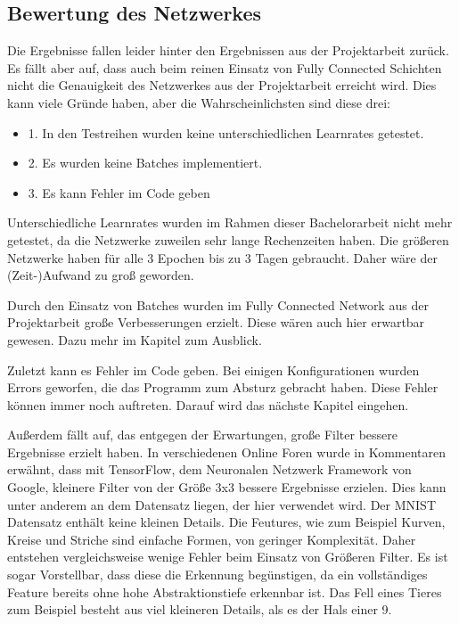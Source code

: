 \documentclass[12pt]{article}
\begin{document}
\subsection{Bewertung des Netzwerkes}
Die Ergebnisse fallen leider hinter den Ergebnissen aus der Projektarbeit zurück. Es fällt aber auf, dass auch beim reinen Einsatz von Fully Connected Schichten nicht die Genauigkeit des Netzwerkes aus der Projektarbeit erreicht wird. Dies kann viele Gründe haben, aber die Wahrscheinlichsten sind diese drei:
\begin{itemize}
\item 1. In den Testreihen wurden keine unterschiedlichen Learnrates getestet.
\item 2. Es wurden keine Batches implementiert.
\item 3. Es kann Fehler im Code geben
\end{itemize}
Unterschiedliche Learnrates wurden im Rahmen dieser Bachelorarbeit nicht mehr getestet, da die Netzwerke zuweilen sehr lange Rechenzeiten haben. Die größeren Netzwerke haben für alle 3 Epochen bis zu 3 Tagen gebraucht. Daher wäre der (Zeit-)Aufwand zu groß geworden. 

Durch den Einsatz von Batches wurden im Fully Connected Network aus der Projektarbeit große Verbesserungen erzielt. Diese wären auch hier erwartbar gewesen. Dazu mehr im Kapitel zum Ausblick.

Zuletzt kann es Fehler im Code geben. Bei einigen Konfigurationen wurden Errors geworfen, die das Programm zum Absturz gebracht haben. Diese Fehler können immer noch auftreten. Darauf wird das nächste Kapitel eingehen.

Außerdem fällt auf, das entgegen der Erwartungen, große Filter bessere Ergebnisse erzielt haben. In verschiedenen Online Foren wurde in Kommentaren erwähnt, dass mit TensorFlow, dem Neuronalen Netzwerk Framework von Google, kleinere Filter von der Größe 3x3 bessere Ergebnisse erzielen. Dies kann unter anderem an dem Datensatz liegen, der hier verwendet wird. Der MNIST Datensatz enthält keine kleinen Details. Die Feutures, wie zum Beispiel Kurven, Kreise und Striche sind einfache Formen, von geringer Komplexität. Daher entstehen vergleichsweise wenige Fehler beim Einsatz von Größeren Filter. Es ist sogar Vorstellbar, dass diese die Erkennung begünstigen, da ein vollständiges Feature bereits ohne hohe Abstraktionstiefe erkennbar ist. Das Fell eines Tieres zum Beispiel besteht aus viel kleineren Details, als es der Hals einer 9.
\end{document}
